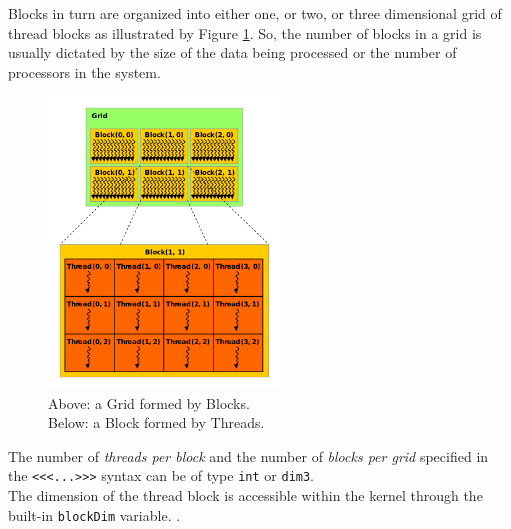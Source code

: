 	Blocks in turn are organized into either one, or two, or three dimensional
	grid of thread blocks as illustrated by Figure \ref{fig:gridblock}.	
	So, the number of blocks in a grid is	usually dictated by the size of the data being processed or the number of processors in the system.
	

	
	
	
	\begin{figure}
		\raggedleft
		\includegraphics[width=0.55\textwidth]{images/gridblocks.png}
		\caption{Above: a Grid formed by Blocks.\\ Below: a Block formed by Threads.}
		\label{fig:gridblock}
	\end{figure}

	
	
	The number of \textit{threads per block} and the number of \textit{blocks per grid} specified in the 	\texttt{<<<...>>>} syntax can be of type \texttt{int} or \texttt{dim3}.\\
	
	The dimension of the thread block is accessible within the kernel through the
	built-in \texttt{blockDim} variable. \cite{cudaguide}.
	
